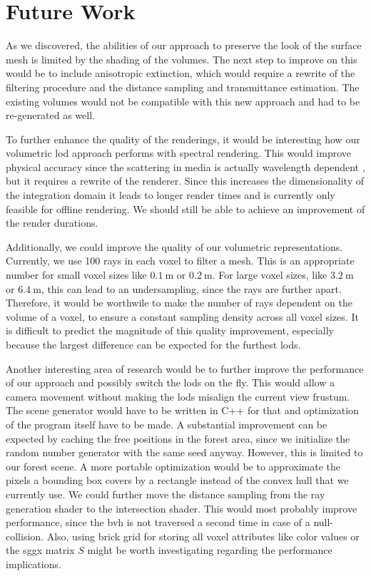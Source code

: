 \chapter{Future Work}
\label{chap:future_work}
As we discovered, the abilities of our approach to preserve the look of the surface mesh is limited by the shading of the volumes.
The next step to improve on this would be to include anisotropic extinction, which would require a rewrite of the filtering procedure and the distance sampling and transmittance estimation.
The existing volumes would not be compatible with this new approach and had to be re-generated as well.

To further enhance the quality of the renderings, it would be interesting how our volumetric \ac{lod} approach performs with spectral rendering.
This would improve physical accuracy since the scattering in media is actually wavelength dependent \cite{novak_overview}, but it requires a rewrite of the renderer.
Since this increases the dimensionality of the integration domain it leads to longer render times and is currently only feasible for offline rendering.
We should still be able to achieve an improvement of the render durations.

Additionally, we could improve the quality of our volumetric representations.
Currently, we use 100 rays in each voxel to filter a mesh.
This is an appropriate number for small voxel sizes like $\SI{0.1}{\m}$ or $\SI{0.2}{\m}$.
For large voxel sizes, like $\SI{3.2}{\m}$ or $\SI{6.4}{\m}$, this can lead to an undersampling, since the rays are further apart.
Therefore, it would be worthwile to make the number of rays dependent on the volume of a voxel, to ensure a constant sampling density across all voxel sizes.
It is difficult to predict the magnitude of this quality improvement, especially because the largest difference can be expected for the furthest \acsp{lod}.

Another interesting area of research would be to further improve the performance of our approach and possibly switch the \acsp{lod} on the fly.
This would allow a camera movement without making the \acsp{lod} misalign the current view frustum.
The scene generator would have to be written in C++ for that and optimization of the program itself have to be made.
A substantial improvement can be expected by caching the free positions in the forest area, since we initialize the random number generator with the same seed anyway.
However, this is limited to our forest scene.
A more portable optimization would be to approximate the pixels a bounding box covers by a rectangle instead of the convex hull that we currently use.
We could further move the distance sampling from the ray generation shader to the intersection shader.
This would most probably improve performance, since the \ac{bvh} is not traversed a second time in case of a null-collision.
Also, using brick grid for storing all voxel attributes like color values or the \ac{sggx} matrix $S$ might be worth investigating regarding the performance implications.

